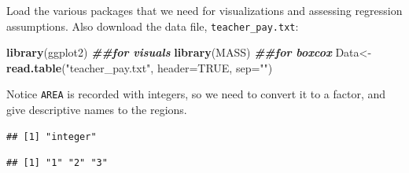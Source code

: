 \documentclass[
]{book}
\newenvironment{Shaded}{\begin{snugshade}}{\end{snugshade}}
\newcommand{\AttributeTok}[1]{\textcolor[rgb]{0.13,0.29,0.53}{#1}}
\newcommand{\ConstantTok}[1]{\textcolor[rgb]{0.56,0.35,0.01}{#1}}
\newcommand{\DocumentationTok}[1]{\textcolor[rgb]{0.56,0.35,0.01}{\textbf{\textit{#1}}}}
\newcommand{\FunctionTok}[1]{\textcolor[rgb]{0.13,0.29,0.53}{\textbf{#1}}}
\newcommand{\NormalTok}[1]{#1}
\newcommand{\OtherTok}[1]{\textcolor[rgb]{0.56,0.35,0.01}{#1}}
\newcommand{\SpecialCharTok}[1]{\textcolor[rgb]{0.81,0.36,0.00}{\textbf{#1}}}
\newcommand{\StringTok}[1]{\textcolor[rgb]{0.31,0.60,0.02}{#1}}
\begin{document}
Load the various packages that we need for visualizations and assessing regression assumptions. Also download the data file, \texttt{teacher\_pay.txt}:

\begin{Shaded}
\begin{Highlighting}[]
\FunctionTok{library}\NormalTok{(ggplot2) }\DocumentationTok{\#\#for visuals}
\FunctionTok{library}\NormalTok{(MASS) }\DocumentationTok{\#\#for boxcox}
\NormalTok{Data}\OtherTok{\textless{}{-}}\FunctionTok{read.table}\NormalTok{(}\StringTok{"teacher\_pay.txt"}\NormalTok{, }\AttributeTok{header=}\ConstantTok{TRUE}\NormalTok{, }\AttributeTok{sep=}\StringTok{""}\NormalTok{)}
\end{Highlighting}
\end{Shaded}

Notice \texttt{AREA} is recorded with integers, so we need to convert it to a factor, and give descriptive names to the regions.

\begin{Shaded}
\end{Shaded}

\begin{verbatim}
## [1] "integer"
\end{verbatim}

\begin{Shaded}
\end{Shaded}

\begin{verbatim}
## [1] "1" "2" "3"
\end{verbatim}

\begin{Shaded}
\end{Shaded}
\end{document}
